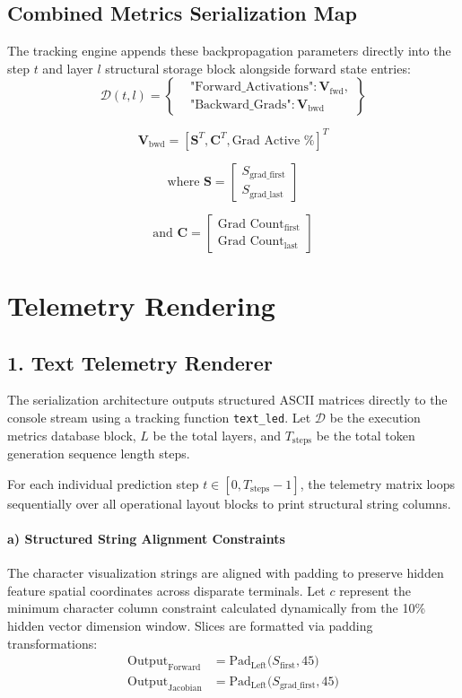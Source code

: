 \documentclass[10pt,conference]{IEEEtran}
\begin{document}
\subsection{Combined Metrics Serialization Map}
The tracking engine appends these backpropagation parameters directly into the step $t$ and layer $l$ structural storage block alongside forward state entries:
\[
\mathcal{D}(t, l) = \left\{ \begin{aligned}
&\text{"Forward\_Activations"}: \mathbf{V}_{\text{fwd}}, \\
&\text{"Backward\_Grads"}: \mathbf{V}_{\text{bwd}}
\end{aligned} \right\}
\]

\[
\mathbf{V}_{\text{bwd}} = [ \mathbf{S}^T, \mathbf{C}^T, \text{Grad Active \%} ]^T
\]

\[
\text{where } \mathbf{S} = \begin{bmatrix} S_{\text{grad\_first}} \\ S_{\text{grad\_last}} \end{bmatrix}
\]

\[
\text{and } \mathbf{C} = \begin{bmatrix} \text{Grad Count}_{\text{first}} \\ \text{Grad Count}_{\text{last}} \end{bmatrix}
\]

\section{Telemetry Rendering}
\subsection*{1. Text Telemetry Renderer}
The serialization architecture outputs structured ASCII matrices directly to the console stream using a tracking function \texttt{text\_led}. Let $\mathcal{D}$ be the execution metrics database block, $L$ be the total layers, and $T_{\text{steps}}$ be the total token generation sequence length steps. 

For each individual prediction step $t \in [0, T_{\text{steps}}-1]$, the telemetry matrix loops sequentially over all operational layout blocks to print structural string columns.

\paragraph*{a) Structured String Alignment Constraints}
The character visualization strings are aligned with padding to preserve hidden feature spatial coordinates across disparate terminals. Let $c$ represent the minimum character column constraint calculated dynamically from the 10\% hidden vector dimension window. Slices are formatted via padding transformations:
\[
\begin{aligned}
\text{Output}_{\text{Forward}} &= \text{Pad}_{\text{Left}}\Big(S_{\text{first}}, 45\Big) \\
\text{Output}_{\text{Jacobian}} &= \text{Pad}_{\text{Left}}\Big(S_{\text{grad\_first}}, 45\Big)
\end{aligned}
\]
\end{document}
